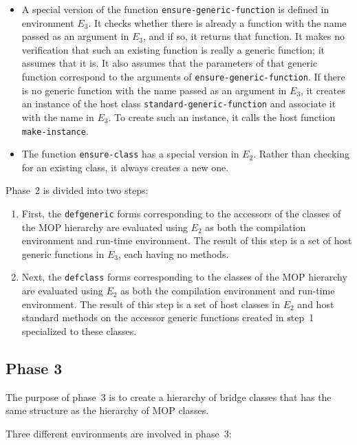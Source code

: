 \begin{itemize}
\item A special version of the function
  \texttt{ensure-generic-function} is defined in environment $E_3$.
  It checks whether there is already a function with the name passed
  as an argument in $E_3$, and if so, it returns that function.  It
  makes no verification that such an existing function is really a
  generic function; it assumes that it is.  It also assumes that the
  parameters of that generic function correspond to the arguments of
  \texttt{ensure-generic-function}.  If there is no generic function
  with the name passed as an argument in $E_3$, it creates an instance
  of the host class \texttt{standard-generic-function} and associate
  it with the name in $E_3$.  To create such an instance, it calls the
  host function \texttt{make-instance}.
\item The function \texttt{ensure-class} has a special version in
  $E_2$.  Rather than checking for an existing class, it always
  creates a new one.
\end{itemize}

Phase~2 is divided into two steps:

\begin{enumerate}
\item First, the \texttt{defgeneric} forms corresponding to the
  accessors of the classes of the MOP hierarchy are evaluated using
  $E_2$ as both the compilation environment and run-time environment.
  The result of this step is a set of host generic functions in $E_3$,
  each having no methods.
\item Next, the \texttt{defclass} forms corresponding to the classes
  of the MOP hierarchy are evaluated using $E_2$ as both the
  compilation environment and run-time environment.  The result of
  this step is a set of host classes in $E_2$ and host standard
  methods on the accessor generic functions created in step~1
  specialized to these classes.
\end{enumerate}

\subsection{Phase 3}

The purpose of phase~3 is to create a hierarchy of bridge classes that
has the same structure as the hierarchy of MOP classes.

Three different environments are involved in phase~3:

